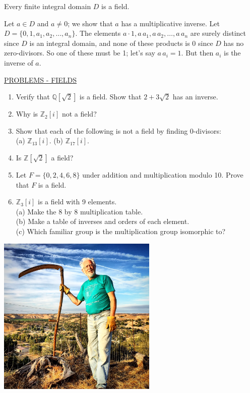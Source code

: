 \documentclass[12pt]{book}
\theoremstyle{definition}
\def\Z{\mathbb{Z}}
\begin{document}
\begin{tctheorem}{}{}
 Every finite integral domain $D$ is a field.
\end{tctheorem}
\begin{newproof}
 Let $a\in D$ and $ a\neq0 $; we show that $a$ has a multiplicative inverse. Let $D=\{0,1,a_1,a_2, \dots, a_n\}$.  The elements $a{\cdot} 1, a\,a_1, a\,a_2, \dots, a\,a_n$ are surely distinct since $D$ is an integral domain, and none of these products is 0 since $D$ has no zero-divisors.  So one of these must be 1; let's say $a\,a_i=1$.  But then $a_i$ is the inverse of $a$.
\end{newproof}
\newpage
\underline{PROBLEMS - FIELDS}
\begin{enumerate}
\item Verify that $\mathbb{Q}[\sqrt2]$ is a field.  Show that $2+3\sqrt2$ has an inverse.
\item Why is $\Z_2[i]$ not a field?
\item Show that each of the following is not a field by finding 0-divisors:\\
(a) $ \Z_{13}[i] $. \qquad (b) $ \Z_{17}[i] $.
\item Is $\Z[\sqrt2]$ a field?
\item Let $F=\{0,2,4,6,8\}$ under addition and multiplication modulo 10.  Prove that $F$ is a field.
\item $ \Z_3[i] $ is a field with 9 elements.\\
(a) Make the 8 by 8 multiplication table.\\
(b) Make a table of inverses and orders of each element.\\
(c) Which familiar group is the multiplication group isomorphic to? 
\end{enumerate}
\vfill
\centerline{\includegraphics[width=3in]{IMG_0454.JPG}}
\vfill
\end{document}
